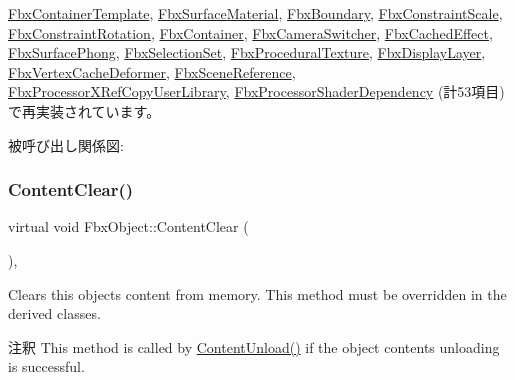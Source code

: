 \hyperlink{class_fbx_container_template_ae43300ebc308b87a6aae824daff21158}{Fbx\+Container\+Template}, \hyperlink{class_fbx_surface_material_aafc5d21293bea6b63a6ea96fa9fe0bb2}{Fbx\+Surface\+Material}, \hyperlink{class_fbx_boundary_acb50e021b1e9920026c975613a949537}{Fbx\+Boundary}, \hyperlink{class_fbx_constraint_scale_af34ea4ce8516d69aefbcb9e83060b2c1}{Fbx\+Constraint\+Scale}, \hyperlink{class_fbx_constraint_rotation_ad9f6469905777a18e3a383f402bdd9b0}{Fbx\+Constraint\+Rotation}, \hyperlink{class_fbx_container_a27222c85d2076c036d1596c25cbc9cd0}{Fbx\+Container}, \hyperlink{class_fbx_camera_switcher_a38011053f3a61df4e93989d7c970fa16}{Fbx\+Camera\+Switcher}, \hyperlink{class_fbx_cached_effect_a0a33b753735747046809b241eadb19d2}{Fbx\+Cached\+Effect}, \hyperlink{class_fbx_surface_phong_aa4262a042d35769e8ff745d408315bf9}{Fbx\+Surface\+Phong}, \hyperlink{class_fbx_selection_set_adcb0af5e3ecfd0957fbf0fe6958d8d6b}{Fbx\+Selection\+Set}, \hyperlink{class_fbx_procedural_texture_ae718dfc2092f735a1b6bcd724029a36c}{Fbx\+Procedural\+Texture}, \hyperlink{class_fbx_display_layer_a5712965749ccf41c758913d2a0ebc0c9}{Fbx\+Display\+Layer}, \hyperlink{class_fbx_vertex_cache_deformer_aed14ffc10416f556b602b87e8d8d6926}{Fbx\+Vertex\+Cache\+Deformer}, \hyperlink{class_fbx_scene_reference_a93aabe2339dc932673dacb8be72eb813}{Fbx\+Scene\+Reference}, \hyperlink{class_fbx_processor_x_ref_copy_user_library_a52eeb515bf8df31ec5d098697fe494b3}{Fbx\+Processor\+X\+Ref\+Copy\+User\+Library}, \hyperlink{class_fbx_processor_shader_dependency_a077ea3e1c83d0a42e597c60153fa5e9a}{Fbx\+Processor\+Shader\+Dependency} (計53項目)で再実装されています。

被呼び出し関係図\+:
\mbox{\label{class_fbx_object_a284f2a438579fcacd8bffd85f556dde2}} 
\subsubsection{\texorpdfstring{Content\+Clear()}{ContentClear()}}
{\footnotesize\ttfamily virtual void Fbx\+Object\+::\+Content\+Clear (\begin{DoxyParamCaption}{ }\end{DoxyParamCaption})\hspace{0.3cm}{\ttfamily [protected]}, {\ttfamily [virtual]}}

Clears this object\textquotesingle{}s content from memory. This method must be overridden in the derived classes. \begin{DoxyRemark}{注釈}
This method is called by \hyperlink{class_fbx_object_ac28653a3c65e840498eebfb54276e483}{Content\+Unload()} if the object content\textquotesingle{}s unloading is successful. 
\end{DoxyRemark}


